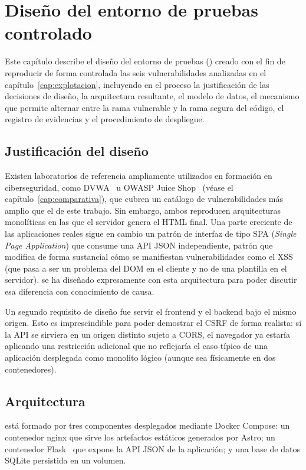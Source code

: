 \chapter{Diseño del entorno de pruebas controlado}
\label{cap:diseno}

Este capítulo describe el diseño del entorno de pruebas (\breachlab)
creado con el fin de reproducir de forma controlada las seis vulnerabilidades
analizadas en el capítulo~\ref{cap:explotacion}, incluyendo en el proceso la justificación de las
decisiones de diseño,
la arquitectura resultante, el modelo de datos, el mecanismo que permite
alternar entre la rama vulnerable y la rama segura del código, el registro
de evidencias y el procedimiento de despliegue.

\section{Justificación del diseño}

Existen laboratorios de referencia ampliamente utilizados en formación en
ciberseguridad, como DVWA~ u OWASP Juice
Shop~ (véase el capítulo~\ref{cap:comparativa}), que
cubren un catálogo de vulnerabilidades más amplio que el de este trabajo.
Sin embargo, ambos reproducen arquitecturas monolíticas en las que el
servidor genera el HTML final. Una parte creciente de las aplicaciones
reales sigue en cambio un patrón de interfaz de tipo SPA (\emph{Single Page
Application}) que consume una API JSON independiente, patrón que modifica de
forma sustancial cómo se manifiestan vulnerabilidades como el XSS (que pasa
a ser un problema del DOM en el cliente y no de una plantilla en el
servidor). \breachlab se ha diseñado expresamente con esta arquitectura para
poder discutir esa diferencia con conocimiento de causa.

Un segundo requisito de diseño fue servir el frontend y el backend bajo el
mismo origen. Esto es imprescindible para poder demostrar el CSRF de forma
realista: si la API se sirviera en un origen distinto sujeto a CORS, el
navegador ya estaría aplicando una restricción adicional que no reflejaría
el caso típico de una aplicación desplegada como monolito lógico (aunque sea
físicamente en dos contenedores).

\section{Arquitectura}

\breachlab está formado por tres componentes desplegados mediante Docker
Compose: un contenedor nginx que sirve los artefactos estáticos generados
por Astro; un contenedor
Flask~ que expone la API JSON de la aplicación; y una base
de datos SQLite persistida
en un volumen. 

